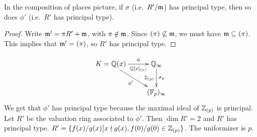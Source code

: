 \begin{claim}
   In the composition of places picture, if $\sigma$ (i.e.~$R'/\mathfrak{m}$) has principal type,
   then so does $\phi'$ (i.e.~$R'$ has principal type).
 \end{claim}
 \begin{proof}
   Write $\mathfrak{m}' = \pi R'+\mathfrak{m}$, with $\pi\not\in \mathfrak{m}$. Since $(\pi)\not\subseteq \mathfrak{m}$, we
   must have $\mathfrak{m}\subseteq (\pi)$. This implies that $\mathfrak{m}'=(\pi)$, so $R'$ has principal
   type.
 \end{proof}
 \begin{example}
   \[\xymatrix{
    K = \QQ(x) \ar[r]^<>(.5)\phi_<>(.5){\QQ[x]_{(x)}} \ar[dr]_{\phi'} & \QQ_\infty \ar[d]^{\sigma_p}_{\ZZ_{(p)}}\\
    & (\FF_p)_\infty
   }\]
   We get that $\phi'$ has principal type because the maximal ideal of $\mathbb{Z}_{(p)}$ is
   principal. Let $R'$ be the valuation ring associated to $\phi'$. Then $\dim R'=2$ and
   $R'$ has principal type. $R' = \{f(x)/g(x)\big| x\nmid g(x), f(0)/g(0)\in
   \mathbb{Z}_{(p)}\}$. The uniformizer is $p$.
 \end{example}
